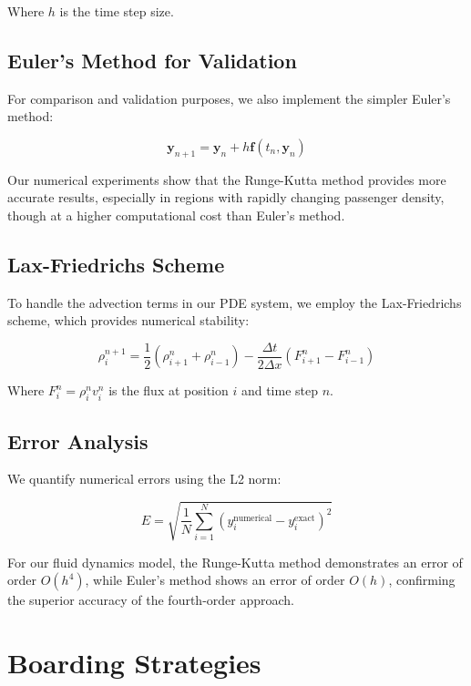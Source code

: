 \documentclass[a4paper,12pt]{article}
\begin{document}
Where $h$ is the time step size.

\subsection{Euler's Method for Validation}

For comparison and validation purposes, we also implement the simpler Euler's method:

\begin{equation}
\mathbf{y}_{n+1} = \mathbf{y}_n + h\mathbf{f}(t_n, \mathbf{y}_n)
\end{equation}

Our numerical experiments show that the Runge-Kutta method provides more accurate results, especially in regions with rapidly changing passenger density, though at a higher computational cost than Euler's method.

\subsection{Lax-Friedrichs Scheme}

To handle the advection terms in our PDE system, we employ the Lax-Friedrichs scheme, which provides numerical stability:

\begin{equation}
\rho_i^{n+1} = \frac{1}{2}(\rho_{i+1}^n + \rho_{i-1}^n) - \frac{\Delta t}{2\Delta x}(F_{i+1}^n - F_{i-1}^n)
\end{equation}

Where $F_i^n = \rho_i^n v_i^n$ is the flux at position $i$ and time step $n$.

\subsection{Error Analysis}

We quantify numerical errors using the L2 norm:

\begin{equation}
E = \sqrt{\frac{1}{N}\sum_{i=1}^{N}(y_i^{\text{numerical}} - y_i^{\text{exact}})^2}
\end{equation}

For our fluid dynamics model, the Runge-Kutta method demonstrates an error of order $O(h^4)$, while Euler's method shows an error of order $O(h)$, confirming the superior accuracy of the fourth-order approach.

\section{Boarding Strategies}
\end{document}
